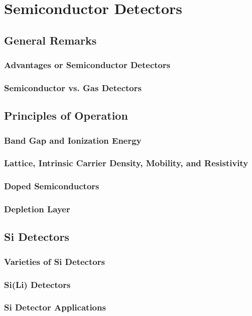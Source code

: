 \section{Semiconductor Detectors}
\subsection{General Remarks}
\subsubsection{Advantages or Semiconductor Detectors}
\subsubsection{Semiconductor vs. Gas Detectors}
\subsection{Principles of Operation}
\subsubsection{Band Gap and Ionization Energy}
\subsubsection{Lattice, Intrinsic Carrier Density,  Mobility, and Resistivity}
\subsubsection{Doped Semiconductors}
\subsubsection{Depletion Layer}
\subsection{Si Detectors}
\subsubsection{Varieties of Si Detectors}
\subsubsection{Si(Li) Detectors}
\subsubsection{Si Detector Applications}
